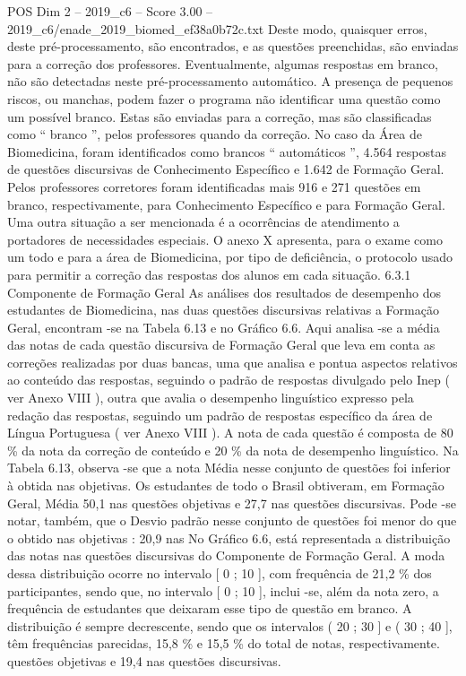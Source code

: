 \begin{textsample}{POS Dim 2 – 2019\_c6 – Score 3.00 – 2019\_c6/enade\_2019\_biomed\_ef38a0b72c.txt}
Deste modo, quaisquer erros, deste pré-processamento, são encontrados, e as questões preenchidas, são enviadas para a correção dos professores.
Eventualmente, algumas respostas em branco, não são detectadas neste pré-processamento automático.
A presença de pequenos riscos, ou manchas, podem fazer o programa não identificar uma questão como um possível branco.
Estas são enviadas para a correção, mas são classificadas como “ branco ”, pelos professores quando da correção.
No caso da Área de Biomedicina, foram identificados como brancos “ automáticos ”, 4.564 respostas de questões discursivas de Conhecimento Específico e 1.642 de Formação Geral.
Pelos professores corretores foram identificadas mais 916 e 271 questões em branco, respectivamente, para Conhecimento Específico e para Formação Geral.
Uma outra situação a ser mencionada é a ocorrências de atendimento a portadores de necessidades especiais.
O anexo X apresenta, para o exame como um todo e para a área de Biomedicina, por tipo de deficiência, o protocolo usado para permitir a correção das respostas dos alunos em cada situação. 6.3.1 Componente de Formação Geral As análises dos resultados de desempenho dos estudantes de Biomedicina, nas duas questões discursivas relativas a Formação Geral, encontram -se na Tabela 6.13 e no Gráfico 6.6.
Aqui analisa -se a média das notas de cada questão discursiva de Formação Geral que leva em conta as correções realizadas por duas bancas, uma que analisa e pontua aspectos relativos ao conteúdo das respostas, seguindo o padrão de respostas divulgado pelo Inep ( ver Anexo VIII ), outra que avalia o desempenho linguístico expresso pela redação das respostas, seguindo um padrão de respostas específico da área de Língua Portuguesa ( ver Anexo VIII ).
A nota de cada questão é composta de 80 \% da nota da correção de conteúdo e 20 \% da nota de desempenho linguístico.
Na Tabela 6.13, observa -se que a nota Média nesse conjunto de questões foi inferior à obtida nas objetivas.
Os estudantes de todo o Brasil obtiveram, em Formação Geral, Média 50,1 nas questões objetivas e 27,7 nas questões discursivas.
Pode -se notar, também, que o Desvio padrão nesse conjunto de questões foi menor do que o obtido nas objetivas : 20,9 nas No Gráfico 6.6, está representada a distribuição das notas nas questões discursivas do Componente de Formação Geral.
A moda dessa distribuição ocorre no intervalo [ 0 ; 10 ], com frequência de 21,2 \% dos participantes, sendo que, no intervalo [ 0 ; 10 ], inclui -se, além da nota zero, a frequência de estudantes que deixaram esse tipo de questão em branco.
A distribuição é sempre decrescente, sendo que os intervalos ( 20 ; 30 ] e ( 30 ; 40 ], têm frequências parecidas, 15,8 \% e 15,5 \% do total de notas, respectivamente. questões objetivas e 19,4 nas questões discursivas.

\end{textsample}
